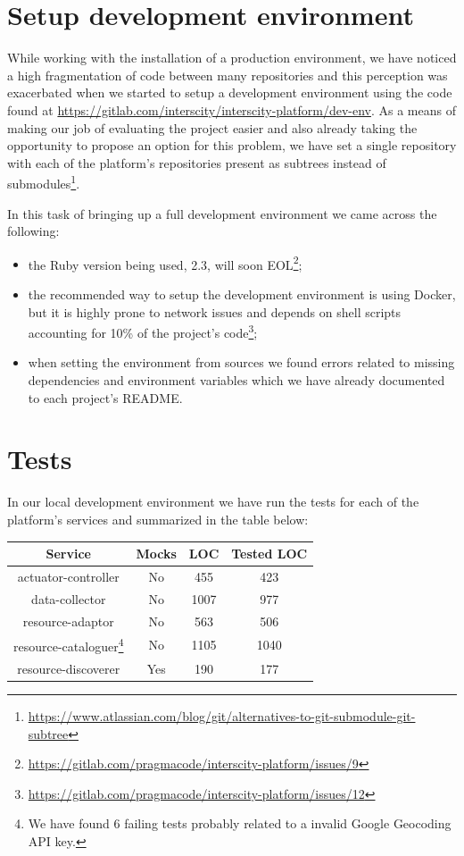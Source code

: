 \documentclass[paper=a4, fontsize=11pt]{scrartcl}
\numberwithin{equation}{section}    %
\numberwithin{figure}{section}      %
\numberwithin{table}{section}        %
\begin{document}
\section{Setup development environment}
  While working with the installation of a production environment, we have noticed a high fragmentation of code between many repositories and this perception was exacerbated when we started to setup a development environment using the code found at \url{https://gitlab.com/interscity/interscity-platform/dev-env}. As a means of making our job of evaluating the project easier and also already taking the opportunity to propose an option for this problem, we have set a single repository with each of the platform's repositories present as subtrees instead of submodules\footnote{\url{https://www.atlassian.com/blog/git/alternatives-to-git-submodule-git-subtree}}.

  In this task of bringing up a full development environment we came across the following:

  \begin{itemize}
    \item the Ruby version being used, 2.3, will soon EOL\footnote{\url{https://gitlab.com/pragmacode/interscity-platform/issues/9}};
    \item the recommended way to setup the development environment is using Docker, but it is highly prone to network issues and depends on shell scripts accounting for 10\% of the project's code\footnote{\url{https://gitlab.com/pragmacode/interscity-platform/issues/12}};
    \item when setting the environment from sources we found errors related to missing dependencies and environment variables which we have already documented to each project's README.
  \end{itemize}

\section{Tests}
  In our local development environment we have run the tests for each of the platform's services and summarized in the table below:

  \vspace{1em}

  \begin{center}
    \begin{tabu} to \textwidth {  c | c | c | c  }
      \textbf{Service} & \textbf{Mocks} & \textbf{LOC} & \textbf{Tested LOC} \\ \hline \hline
      actuator-controller & No & 455 & 423 \\
      data-collector & No & 1007 & 977 \\
      resource-adaptor & No & 563 & 506 \\
      resource-cataloguer\footnote{We have found 6 failing tests probably related to a invalid Google Geocoding API key.} & No & 1105 & 1040 \\
      resource-discoverer & Yes & 190 & 177 \\
    \end{tabu}
  \end{center}
\end{document}
